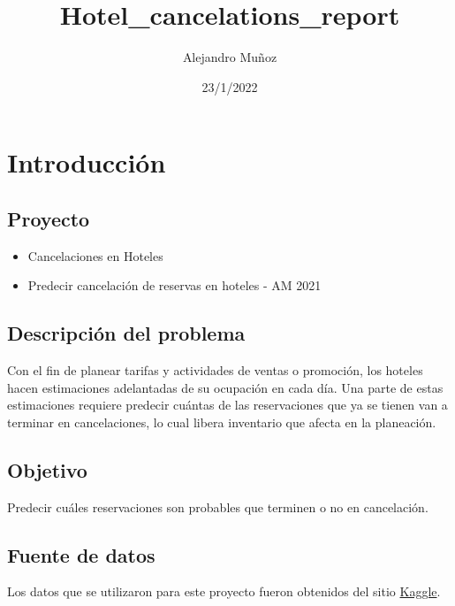 \documentclass[
]{article}
\title{Hotel\_cancelations\_report}
\author{Alejandro Muñoz}
\date{23/1/2022}
\providecommand{\tightlist}{%
  \setlength{\itemsep}{0pt}\setlength{\parskip}{0pt}}
\begin{document}
\maketitle

\hypertarget{introducciuxf3n}{%
\section{Introducción}\label{introducciuxf3n}}

\hypertarget{proyecto}{%
\subsection{Proyecto}\label{proyecto}}

\begin{itemize}
\tightlist
\item
  Cancelaciones en Hoteles
\item
  Predecir cancelación de reservas en hoteles - AM 2021
\end{itemize}

\hypertarget{descripciuxf3n-del-problema}{%
\subsection{Descripción del
problema}\label{descripciuxf3n-del-problema}}

Con el fin de planear tarifas y actividades de ventas o promoción, los
hoteles hacen estimaciones adelantadas de su ocupación en cada día. Una
parte de estas estimaciones requiere predecir cuántas de las
reservaciones que ya se tienen van a terminar en cancelaciones, lo cual
libera inventario que afecta en la planeación.

\hypertarget{objetivo}{%
\subsection{Objetivo}\label{objetivo}}

Predecir cuáles reservaciones son probables que terminen o no en
cancelación.

\hypertarget{fuente-de-datos}{%
\subsection{Fuente de datos}\label{fuente-de-datos}}

Los datos que se utilizaron para este proyecto fueron obtenidos del
sitio
\href{https://www.kaggle.com/c/cancelaciones-en-hoteles/data}{Kaggle}.
\end{document}
